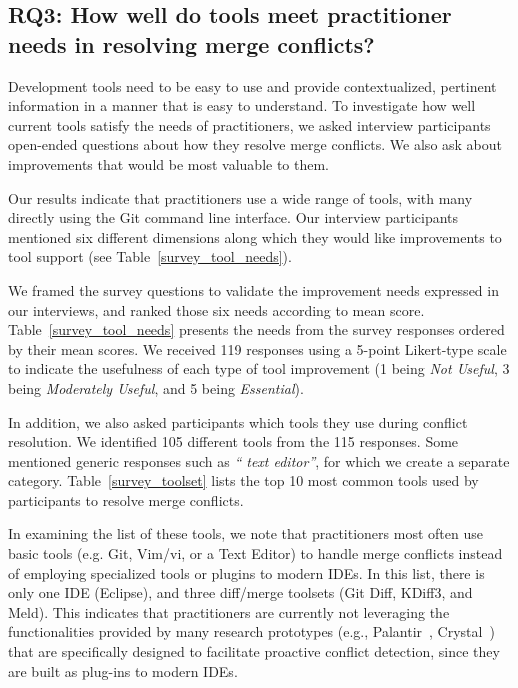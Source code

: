 
\subsection{\textbf{RQ3:} How well do tools meet practitioner needs in resolving merge conflicts?}\label{RQ3}
Development tools need to be easy to use and provide contextualized, pertinent information in a manner that is easy to understand.
To investigate how well current tools satisfy the needs of practitioners, we asked interview participants open-ended questions about how they resolve merge conflicts.
We also ask about improvements that would be most valuable to them. 

Our results indicate that practitioners use a wide range of tools, with many directly using the Git command line interface. Our interview participants mentioned six different dimensions along which they would like improvements to tool support (see Table~\ref{survey_tool_needs}). 

We framed the survey questions to validate the improvement needs expressed in our interviews, and ranked those six needs according to mean score.
Table~\ref{survey_tool_needs} presents the needs from the survey responses ordered by their mean scores.
We received 119 responses using a 5-point Likert-type scale to indicate the usefulness of each type of tool improvement (1 being \textit{Not Useful}, 3 being \textit{Moderately Useful}, and 5 being \textit{Essential}).

In addition, we also asked participants which tools they use during conflict resolution.
We identified 105 different tools from the 115 responses. Some mentioned generic responses such as \textit{`` text editor''}, for which we create a separate category.
Table~\ref{survey_toolset} lists the top 10 most common tools used by participants to resolve merge conflicts.

In examining the list of these tools, we note that practitioners most often use basic tools (e.g. Git, Vim/vi, or a Text Editor) to handle merge conflicts instead of employing specialized tools or plugins to modern IDEs. 
In this list, there is only one IDE (Eclipse), and three diff/merge toolsets (Git Diff, KDiff3, and Meld). 
This indicates that practitioners are currently not leveraging the functionalities provided by many research prototypes (e.g., Palantir~\cite{palantir}, Crystal~\cite{Brun2011}) that are specifically designed to facilitate proactive conflict detection, since they are built as plug-ins to modern IDEs. 

